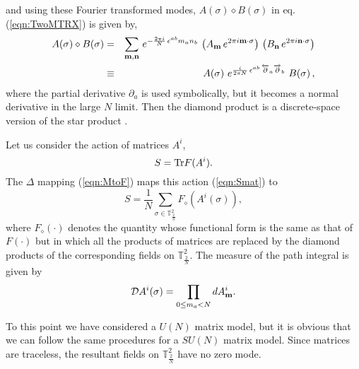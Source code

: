 \documentclass[12pt,a4paper]{article}
\newcommand{\ncpl}{{\mathbb T}^2_\frac{2}{N}}
\newcommand{\Tr}{\mbox{\rm Tr}}
\begin{document}
and using these Fourier transformed modes, $A(\sigma)\diamond
B(\sigma)$ in eq.(\ref{eqn:TwoMTRX}) is given by,
\begin{eqnarray}
    A(\sigma)\diamond B(\sigma)&=&
      \sum_{\bf m,n}\,e^{-\frac{2\pi i}{N}\,\epsilon^{ab} m_an_b}\,
      \left(A_{\bf m}\,e^{2\pi i{\bf m}\cdot\sigma}\right)\,
      \left(B_{\bf n}\,e^{2\pi i{\bf n}\cdot\sigma}\right)\nonumber\\
    &\equiv&A(\sigma)~e^{ \frac{i}{2\pi N}\,\epsilon^{ab}\,
	{\overleftarrow\partial}_a{\overrightarrow\partial}_b}~B(\sigma)\,,
	\label{eqn:TwoMXFT}
\end{eqnarray}
where the partial derivative $\partial_a$ is used symbolically, but
it becomes a normal derivative in the large $N$ limit.
Then the diamond product is a discrete-space version of the star
product \cite{bars}.

Let us consider the action of matrices $A^i$,
\begin{equation}
	S= \Tr F(A^i). \label{eqn:Smat}
\end{equation}
The $\Delta$ mapping (\ref{eqn:MtoF}) maps this action (\ref{eqn:Smat})
to
\begin{equation}
	S={\frac{1}{N}}\sum_{\sigma\in\ncpl}F_\diamond(A^i(\sigma)),
\label{eqn:Sgen}
\end{equation}
where $F_\diamond(\cdot)$ denotes the quantity whose functional form is
the same as that of $F(\cdot)$ but in which all the products of
matrices are replaced by the diamond products of the corresponding
fields on $\ncpl$.
The measure of the path integral is given by
\begin{equation}
	{\cal D}A^i(\sigma)=\prod_{0\leq m_a < N}dA^i_{\bf m}.
\end{equation}

To this point we have considered a $U(N)$ matrix model, but it is
obvious that we can follow the same procedures for a $SU(N)$ matrix
model. Since matrices are traceless, the resultant fields on $\ncpl$
have no zero mode.

\end{document}

